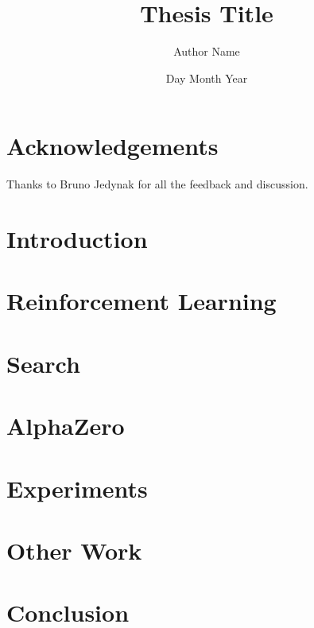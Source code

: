 \documentclass[12pt,twoside]{report}
\title{Thesis Title}
\author{Author Name}
\date{Day Month Year}
\begin{document}




\chapter*{Acknowledgements}
Thanks to Bruno Jedynak for all the feedback and discussion. 

\tableofcontents


\chapter{Introduction}


\chapter{Reinforcement Learning}


\chapter{Search}


\chapter{AlphaZero}


\chapter{Experiments}


\chapter{Other Work}


\chapter{Conclusion}


\listoffigures

\printbibliography
\end{document}
